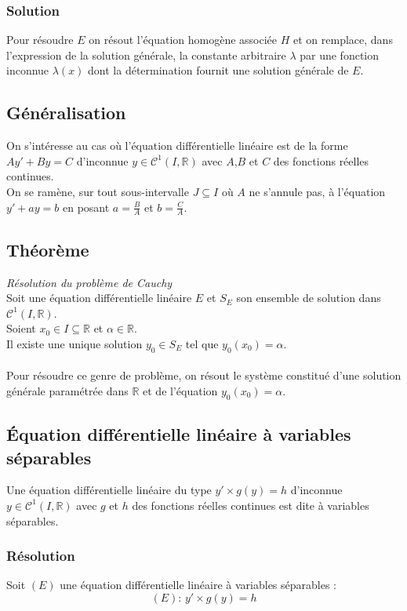 \documentclass[a4paper,10pt]{book} %
\newcommand{\R}{\mathbb{R}}
\newcommand{\edl}{équation différentielle linéaire }
\begin{document}
\subsubsection{Solution}
Pour résoudre $E$ on résout l'équation homogène associée $H$ et on remplace, dans l'expression de la solution générale, la constante arbitraire $\lambda$ par une fonction inconnue $\lambda(x)$ dont la détermination fournit une solution générale de $E$.

\subsection{Généralisation}
On s’intéresse au cas où l'\edl est de la forme $Ay'+By=C$ d'inconnue $y\in \mathcal{C}^1(I,\R)$ avec $A$,$B$ et $C$ des fonctions réelles continues.\\

On se ramène, sur tout sous-intervalle $J\subseteq I$ où $A$ ne s'annule pas, à l'équation $y'+ay=b$ en posant $a=\frac{B}{A}$ et $b=\frac{C}{A}$.\\

\subsection{Théorème}
\textit{Résolution du problème de Cauchy}\\

Soit une \edl $E$ et $S_E$ son ensemble de solution dans $\mathcal{C}^1(I,\R)$.\\
Soient $x_0 \in  I\subseteq \R$ et $\alpha \in \R$.\\

Il existe une unique solution $y_0\in S_E$ tel que $y_0(x_0)=\alpha$.\\\\
Pour résoudre ce genre de problème, on résout le système constitué d'une solution générale paramétrée dans $\R$ et de l'équation $y_0(x_0)=\alpha$.

\subsection{Équation différentielle linéaire à variables séparables}
Une \edl du type $y'\times g(y)=h$ d'inconnue $y \in \mathcal{C}^1(I,\R)$ avec $g$ et $h$ des fonctions réelles continues est dite à variables séparables.

\subsubsection{Résolution}
Soit $(E)$ une \edl à variables séparables :
$$(E)\text{: } y'\times g(y)=h$$\\
\end{document}
